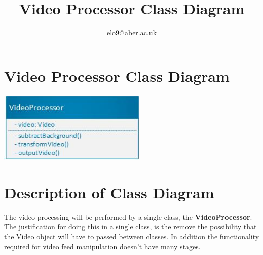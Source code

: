 \documentclass{article}
\title{Video Processor Class Diagram}
\author{elo9@aber.ac.uk}
\begin{document}
\maketitle
\tableofcontents

\newpage

\section{Video Processor Class Diagram}
\includegraphics[width=200pt]{VideoProcessorClassDiagramImage}


\section{Description of Class Diagram}
The video processing will be performed by a single class, the \textbf{VideoProcessor}. The justification for doing this in a single class, is the remove the possibility that the Video object will have to passed between classes. In addition the functionality required for video feed manipulation doesn't have many stages.
\end{document}
